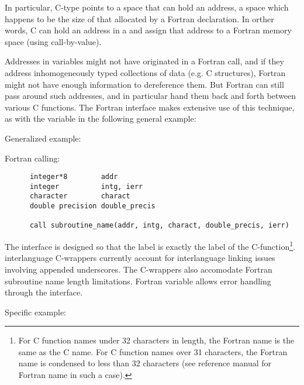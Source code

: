 \vspace{0.2in}

In particular, C-type
 points to a space that can hold an address, a space
which happens to be the size of that allocated by a Fortran
 declaration.
In orther words, C can hold an address in a  and
assign that address to a Fortran  memory space
(using  call-by-value).

Addresses in  variables might not have originated
in a Fortran call, and if they address inhomogeneously typed collections
of data (e.g. C structures), Fortran might not have enough information to
dereference them.  But Fortran can still pass around such addresses, and in
particular hand them back and forth between various C functions.  The
\hypre{} Fortran interface makes extensive use of this technique,
as with the  variable in the following general example:

\vspace{0.1in}

\noindent Generalized example:

\vspace{0.1in}

  Fortran calling:
\begin{verbatim}
      integer*8        addr
      integer          intg, ierr
      character        charact
      double precision double_precis

      call subroutine_name(addr, intg, charact, double_precis, ierr)
\end{verbatim}

The interface is designed so that the label  is
exactly the label of the \hypre{} C-function\footnote{For C function
names under 32 characters in length, the Fortran name is the same as
the C name.  For C function names over 31 characters, the Fortran name
is condensed to less than 32 characters (see reference manual for
Fortran name in such a case).}.  \hypre{} interlanguage C-wrappers
currently account for interlanguage linking issues involving appended
underscores.  The C-wrappers also accomodate Fortran subroutine name
length limitations.  Fortran variable
 allows error handling through the interface.

\vspace{0.1in}

\noindent Specific example:

\vspace{0.1in}

